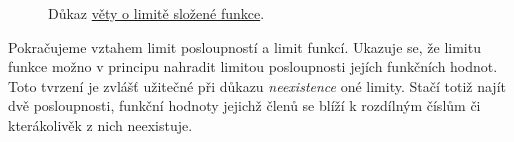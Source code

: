 \begin{figure}[ht]
 \caption{Důkaz \hyperref[thm:limita-slozene-funkce]{věty o limitě složené
 funkce}.}
 \label{fig:limita-slozene-funkce}
\end{figure}

Pokračujeme vztahem limit posloupností a limit funkcí. Ukazuje se, že limitu
funkce možno v principu nahradit limitou posloupnosti jejích funkčních hodnot.
Toto tvrzení je zvlášť užitečné při důkazu \emph{neexistence} oné limity. Stačí
totiž najít dvě posloupnosti, funkční hodnoty jejichž členů se blíží k rozdílným
číslům či kterákolivěk z nich neexistuje.

